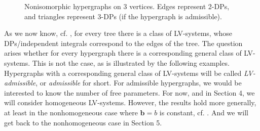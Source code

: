 \documentclass{article}
\def\b{{\mathbf b}}
\begin{document}
\begin{figure}[h]
\begin{subfigure}{0.15\textwidth}
\end{subfigure}
\caption{\label{nih3} Nonisomorphic hypergraphs on 3 vertices. Edges represent 2-DPs, and triangles represent 3-DPs (if the hypergraph is admissible).}
\end{figure}

As we now know, cf. \cite{QTMK,trees}, for every tree there is a class of LV-systems, whose DPs/independent integrals correspond to the edges of the tree. The question arises whether for every hypergraph there is a corresponding general class of LV-systems. This is not the case, as is illustrated by the following examples. Hypergraphs with a corresponding general class of LV-systems will be called {\em LV-admissible}, or {\em admissible} for short. For admissible hypergraphs, we would be interested to know the number of free parameters. For now, and in Section 4, we will consider homogeneous LV-systems. However, the results hold more generally, at least in the nonhomogeneous case where $\b=b$ is constant, cf. \cite[Theorem 3.1]{HDP}. And we will get back to the nonhomogeneous case in Section 5.
\end{document}
